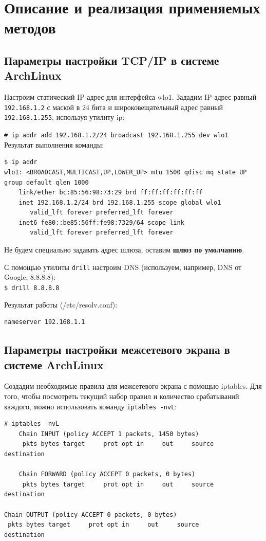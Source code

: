 \documentclass[a4paper]{article}
\begin{document}
	\section{Описание и реализация применяемых методов}
		\subsection{Параметры настройки TCP/IP в системе ArchLinux}
		
		Настроим статический IP-адрес для интерфейса wlo1. Зададим IP-адрес равный \texttt{192.168.1.2} с маской в 24 бита и широковещательный адрес равный \texttt{192.168.1.255}, используя утилиту ip: 
		
		\texttt{\# ip addr add 192.168.1.2/24 broadcast 192.168.1.255 dev wlo1}\\
				
		Результат выполнения команды:
		\begin{verbatim}
$ ip addr
wlo1: <BROADCAST,MULTICAST,UP,LOWER_UP> mtu 1500 qdisc mq state UP group default qlen 1000
    link/ether bc:85:56:98:73:29 brd ff:ff:ff:ff:ff:ff
    inet 192.168.1.2/24 brd 192.168.1.255 scope global wlo1
       valid_lft forever preferred_lft forever
    inet6 fe80::be85:56ff:fe98:7329/64 scope link 
       valid_lft forever preferred_lft forever
		\end{verbatim}
		
		Не будем специально задавать адрес шлюза, оставим \textbf{шлюз по умолчанию}.
		
		С помощью утилиты \texttt{drill} настроим DNS (используем, например, DNS от Google, 8.8.8.8):\\
		
		\texttt{\$ drill 8.8.8.8}
		
		Результат работы (/etc/resolv.conf):
		\begin{verbatim}
nameserver 192.168.1.1
		\end{verbatim}
		

		\subsection{Параметры настройки межсетевого экрана в системе ArchLinux}
		
		Создадим необходимые правила для межсетевого экрана с помощью iptables. Для того, чтобы посмотреть текущий набор правил и количество срабатываний каждого, можно использовать команду \texttt{iptables -nvL}:
		\begin{verbatim}
# iptables -nvL
	Chain INPUT (policy ACCEPT 1 packets, 1450 bytes)
	 pkts bytes target     prot opt in     out     source               	destination         

	Chain FORWARD (policy ACCEPT 0 packets, 0 bytes)
	 pkts bytes target     prot opt in     out     source               	destination         

Chain OUTPUT (policy ACCEPT 0 packets, 0 bytes)
 pkts bytes target     prot opt in     out     source               destination     

		\end{verbatim}
		 
\end{document}
